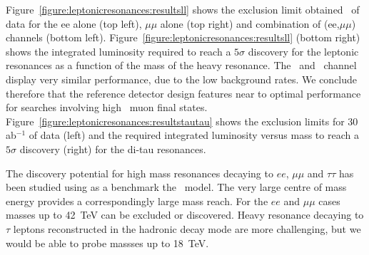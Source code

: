 Figure~\ref{figure:leptonicresonances:resultsll} shows the exclusion limit obtained \intlumifcc\ of data for the ee alone (top left), $\mu\mu$ alone (top right) and combination of (ee,$\mu\mu$) channels (bottom left). Figure~\ref{figure:leptonicresonances:resultsll} (bottom right) shows the integrated luminosity required to reach a $5\sigma$ discovery for the leptonic resonances as a function of the mass of the heavy resonance. The \Zpee\ and \Zpmumu\ channel display very similar performance, due to the low background rates. We conclude therefore that the reference detector design features near to optimal performance for searches involving high \pT\ muon final states. Figure~\ref{figure:leptonicresonances:resultstautau} shows the exclusion limits for 30 ab$^{-1}$ of data (left) and the required integrated luminosity
versus mass to reach a $5\sigma$ discovery (right) for the di-tau resonances.

The discovery potential for high mass resonances decaying to $ee$, $\mu\mu$ and $\tau\tau$ has been studied using as a benchmark the \ZpSSM\ model. The very large centre of mass energy provides a correspondingly large mass reach. For the $ee$ and $\mu\mu$ cases masses up to 42~TeV can be excluded or discovered. Heavy resonance decaying to $\tau$ leptons reconstructed in the hadronic decay mode are more challenging, but we would be able to probe massses up to 18~TeV.

